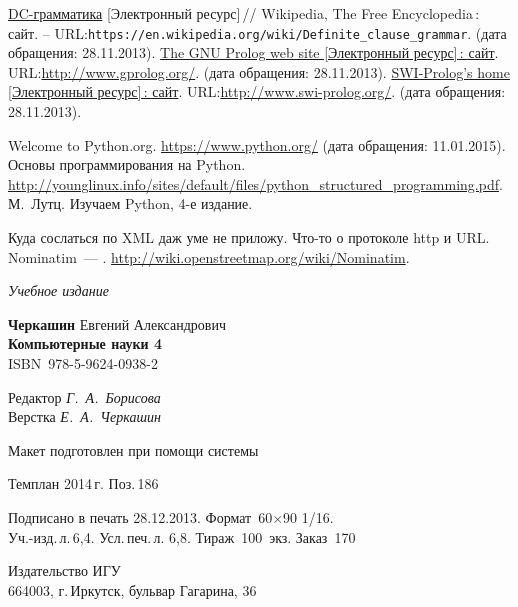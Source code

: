 \documentclass[a4paper,14pt, openany, twoside, draft]{extbook} %
\def\emphbib#1{#1}
\begin{document}
\begin{thebibliography}{99}
 \emphbib{\href{https://en.wikipedia.org/wiki/Definite_clause_grammar}{DC-грамматика}} [Электронный ресурс]\,{}// Wikipedia, The Free Encyclopedia\,{}: сайт. -- URL:\texttt{https://en.wikipedia.org/wiki/Definite\_clause\linebreak\_grammar}. (дата обращения: 28.11.2013).
 \emphbib{\href{http://www.gprolog.org/}{The GNU Prolog web site [Электронный ресурс]\,{}: сайт}}. URL:\url{http://www.gprolog.org/}. (дата обращения: 28.11.2013).
 \emphbib{\href{http://www.swi-prolog.org/}{SWI-Prolog's home [Электронный ресурс]\,{}: сайт}}. URL:\url{http://www.swi-prolog.org/}. (дата обращения: 28.11.2013).

 Welcome to Python.org. \url{https://www.python.org/} (дата обращения: 11.01.2015).
 Основы программирования на Python. \url{http://younglinux.info/sites/default/files/python_structured_programming.pdf}.
 М.~Лутц. Изучаем Python, 4-е издание.

 Куда сослаться по XML даж уме не приложу.
 Что-то о протоколе http и URL.
 Nominatim~--- . \url{http://wiki.openstreetmap.org/wiki/Nominatim}.

\end{thebibliography}
\label{lastpage}
\newpage
\thispagestyle{empty}
\mbox{}

\vfill\vfill\vfill\vfill

\hfill{}{\small\itshape Учебное издание}
\vspace{4ex}
\begin{center}
{\small\textbf{Черкашин} Евгений Александрович\\[1em]}
{\bfseries Компьютерные науки 4}\\[1em]
ISBN~978-5-9624-0938-2
\vfill

\small
Редактор \textit{Г.~А.~Борисова}\\
Верстка \textit{Е.~А.~Черкашин}

\vfill{}
{\small Макет подготовлен при помощи системы \LuaLaTeX\\\mbox{}}
\vfill{}

Темплан 2014\,{}г. Поз.\,{}186

\end{center}
\begin{center}\small
\noindent Подписано в печать 28.12.2013.
Формат~60$\times$90 1/16.\\  %
Уч.-изд.\,{}л.\,{}6,4. Усл.\,{}печ.\,{}л. 6,8. Тираж~100~экз. Заказ~170
\end{center}
\vspace{1ex}
\begin{center}\small
Издательство ИГУ\\{}
664003, г.\,{}Иркутск, бульвар Гагарина, 36
\end{center}
\end{document}
